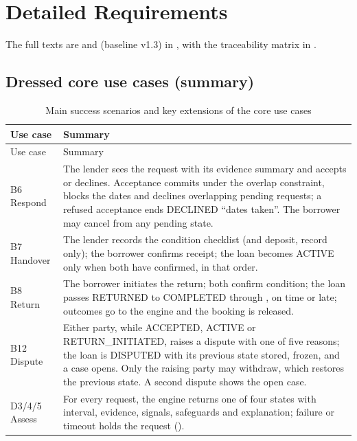 \chapter{Detailed Requirements}\label{app:detailed-requirements}
The full texts are  and  (baseline v1.3) in , with the traceability matrix in .

\section{Dressed core use cases (summary)}\label{sec:dressed-core-use-cases-summary}
\begingroup
\begin{longtable}{@{}L{68pt}L{315pt}@{}}
\caption{Main success scenarios and key extensions of the core use cases}\label{tab:main-success-scenarios-key}\\
\toprule
Use case & Summary \\
\midrule
\endfirsthead
\toprule
Use case & Summary \\
\midrule
\endhead
\bottomrule
\endlastfoot
B6 Respond & The lender sees the request with its evidence summary and accepts or declines. Acceptance commits under the overlap constraint, blocks the dates and declines overlapping pending requests; a refused acceptance ends DECLINED ``dates taken''. The borrower may cancel from any pending state. \\
B7 Handover & The lender records the condition checklist (and deposit, record only); the borrower confirms receipt; the loan becomes ACTIVE only when both have confirmed, in that order. \\
B8 Return & The borrower initiates the return; both confirm condition; the loan passes RETURNED to COMPLETED through , on time or late; outcomes go to the engine and the booking is released. \\
B12 Dispute & Either party, while ACCEPTED, ACTIVE or RETURN\_INITIATED, raises a dispute with one of five reasons; the loan is DISPUTED with its previous state stored, frozen, and a case opens. Only the raising party may withdraw, which restores the previous state. A second dispute shows the open case. \\
D3/4/5 Assess & For every request, the engine returns one of four states with interval, evidence, signals, safeguards and explanation; failure or timeout holds the request (). \\

\end{longtable}
